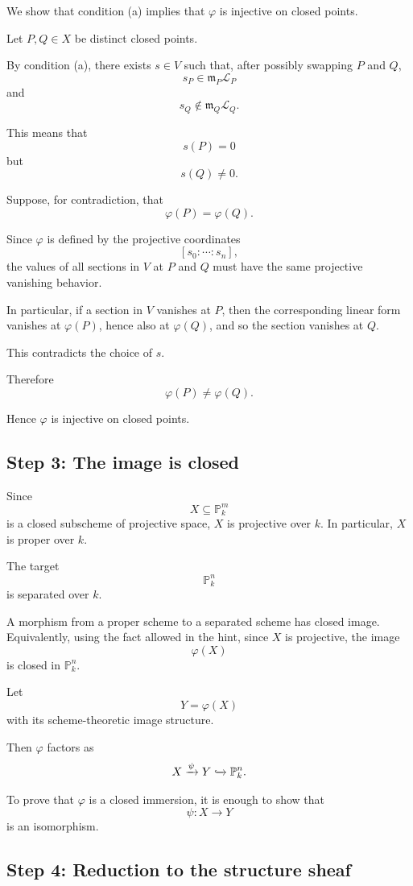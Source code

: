 \documentclass[12pt,a4paper]{article}
\theoremstyle{notespace}
\begin{document}
We show that condition (a) implies that $\varphi$ is injective on closed
points.

Let $P,Q\in X$ be distinct closed points.

By condition (a), there exists $s\in V$ such that, after possibly swapping
$P$ and $Q$,
\[
s_P\in \mathfrak m_P\mathcal L_P
\]
and
\[
s_Q\notin \mathfrak m_Q\mathcal L_Q.
\]

This means that
\[
s(P)=0
\]
but
\[
s(Q)\neq0.
\]

Suppose, for contradiction, that
\[
\varphi(P)=\varphi(Q).
\]

Since $\varphi$ is defined by the projective coordinates
\[
[s_0:\cdots:s_n],
\]
the values of all sections in $V$ at $P$ and $Q$ must have the same
projective vanishing behavior.

In particular, if a section in $V$ vanishes at $P$, then the corresponding
linear form vanishes at $\varphi(P)$, hence also at $\varphi(Q)$, and so the
section vanishes at $Q$.

This contradicts the choice of $s$.

Therefore
\[
\varphi(P)\neq \varphi(Q).
\]

Hence $\varphi$ is injective on closed points.

\subsection*{Step 3: The image is closed}

Since
\[
X\subseteq \mathbb P_k^m
\]
is a closed subscheme of projective space, $X$ is projective over $k$.
In particular, $X$ is proper over $k$.

The target
\[
\mathbb P_k^n
\]
is separated over $k$.

A morphism from a proper scheme to a separated scheme has closed image.
Equivalently, using the fact allowed in the hint, since $X$ is projective,
the image
\[
\varphi(X)
\]
is closed in $\mathbb P_k^n$.

Let
\[
Y=\varphi(X)
\]
with its scheme-theoretic image structure.

Then $\varphi$ factors as
\[
X\xrightarrow{\psi}Y\xhookrightarrow{} \mathbb P_k^n.
\]

To prove that $\varphi$ is a closed immersion, it is enough to show that
\[
\psi:X\to Y
\]
is an isomorphism.

\subsection*{Step 4: Reduction to the structure sheaf}
\end{document}
